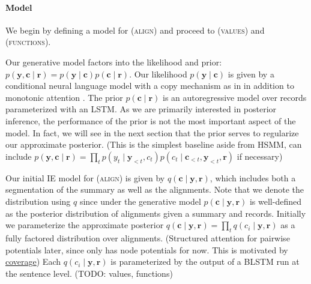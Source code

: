 \documentclass[11pt]{article}
\newcommand{\bc}{\mathbf{c}}
\newcommand{\br}{\mathbf{r}}
\newcommand{\by}{\mathbf{y}}
\begin{document}
\paragraph{Model}
We begin by defining a model for (\textsc{align})
and proceed to (\textsc{values}) and (\textsc{functions}).

Our generative model factors into the
likelihood and prior: $p(\by,\bc\mid\br)=p(\by\mid\bc)p(\bc\mid\br)$.
Our likelihood $p(\by\mid\bc)$ is given by a conditional neural language model
with a copy mechanism as in \citet{gulcehre2016cc,wiseman2017d2t}
in addition to monotonic attention \citep{yu2016ssnt,wiseman2018template}.
The prior $p(\bc\mid\br)$ is an autoregressive model over records
parameterized with an LSTM.
As we are primarily interested in posterior inference, the performance of the prior is
not the most important aspect of the model.
In fact, we will see in the next section that the prior serves to regularize
our approximate posterior.
(This is the simplest baseline aside from HSMM, can include 
$p(\by,\bc\mid\br)=\prod_tp(y_t\mid\by_{<t},c_t)p(c_t\mid\bc_{<t},\by_{<t},\br)$
if necessary)

Our initial IE model for (\textsc{align}) is given by $q(\bc\mid\by,\br)$,
which includes both a segmentation of the summary as well as the alignments.
Note that we denote the distribution using $q$ since under the generative model
$p(\bc\mid\by,\br)$ is well-defined as the posterior distribution of alignments
given a summary and records.
Initially we parameterize the approximate posterior
$q(\bc\mid\by,\br)=\prod_tq(c_i\mid\by,\br)$
as a fully factored distribution over alignments.
(Structured attention for pairwise potentials later,
since only has node potentials for now.
This is motivated by \underline{coverage})
Each $q(c_i\mid\by,\br)$ is parameterized by the output
of a BLSTM run at the sentence level.
(TODO: values, functions)
\end{document}
